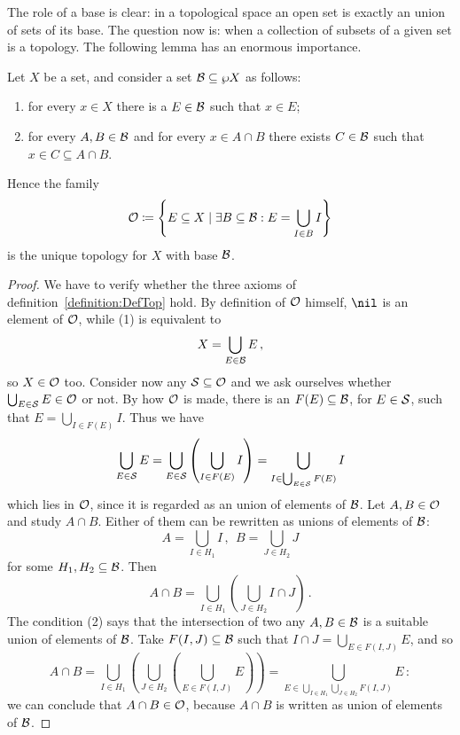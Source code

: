 The role of a base is clear: in a topological space an open set is exactly an union of sets of its base. The question now is: when a collection of subsets of a given set is a topology. The following lemma has an enormous importance.

\begin{theorem}\label{theorem:BaseLemma}
Let \(X\) be a set, and consider a set \(\mathcal B \subseteq \wp X\) as follows:
\begin{enumerate}
\item for every \(x \in X\) there is a \(E \in \mathcal B\) such that \(x \in E\);
\item for every \(A, B \in \mathcal B\) and for every \(x \in A \cap B\) there exists \(C \in \mathcal B\) such that \(x \in C \subseteq A \cap B\).
\end{enumerate}
Hence the family
\[\mathcal O \coloneq \left\{E \subseteq X \mid \exists B \subseteq \mathcal B : E = \bigcup_{I \in B} I\right\}\]
is the unique topology for \(X\) with base \(\mathcal B\).
\end{theorem}

\begin{proof}
We have to verify whether the three axioms of definition~\ref{definition:DefTop} hold.\newline
By definition of \(\mathcal O\) himself, \(\nil\) is an element of \(\mathcal O\), while (1) is equivalent to
\[X = \bigcup_{E \in \mathcal B} E\,,\]
so \(X \in \mathcal O\) too. Consider now any \(\mathcal S \subseteq \mathcal O\) and we ask ourselves whether \(\bigcup_{E \in \mathcal S} E \in \mathcal O\) or not. By how \(\mathcal O\) is made, there is an \(F(E) \subseteq \mathcal B\), for \(E \in \mathcal S\), such that \(E = \bigcup_{I \in F(E)} I\). Thus we have
\[\bigcup_{E \in \mathcal S} E = \bigcup_{E \in \mathcal S} \left(\bigcup_{I \in F(E)} I\right) = \bigcup_{I \in \bigcup_{E \in \mathcal S} F(E)} I\]
which lies in \(\mathcal O\), since it is regarded as an union of elements of \(\mathcal B\). Let \(A, B \in \mathcal O\) and study \(A \cap B\). Either of them can be rewritten as unions of elements of \(\mathcal B\):
\[A = \bigcup_{I \in H_1} I \,, \ \ B = \bigcup_{J \in H_2} J\]
for some \(H_1, H_2 \subseteq \mathcal B\). Then
\[A \cap B = \bigcup_{I \in H_1} \left(\bigcup_{J \in H_2} I \cap J\right)\,.\]
The condition (2) says that the intersection of two any \(A, B \in \mathcal B\) is a suitable union of elements of \(\mathcal B\). Take \(F(I, J) \subseteq \mathcal B\) such that \(I \cap J = \bigcup_{E \in F(I, J)} E\), and so
\[A \cap B = \bigcup_{I \in H_1} \left( \bigcup_{J \in H_2} \left( \bigcup_{E \in F(I, J)} E \right) \right) = \bigcup_{E \in \bigcup_{I \in H_1} \bigcup_{J \in H_2} F(I, J)} E\,:\]
we can conclude that \(A \cap B \in \mathcal O\), because \(A \cap B\) is written as union of elements of \(\mathcal B\).
\end{proof}

